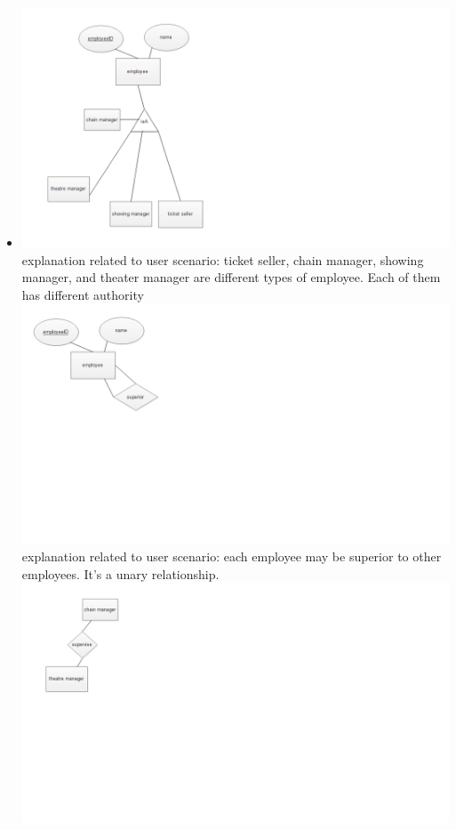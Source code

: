 {\begin{itemize}
explanation related to user scenario: a theatre manager of that theatre can manage all the stuff in that theatre, including showing, movie, and moviegoer.
\item{ }
\includegraphics[scale=0.3]{isA.png}
explanation related to user scenario: ticket seller, chain manager, showing manager, and theater manager are different types of employee. Each of them has different authority
\includegraphics[scale=0.3]{superior.png}
explanation related to user scenario: each employee may be superior to other employees. It's a unary relationship.
\includegraphics[scale=0.3]{supervise.png}

\end{itemize}}
